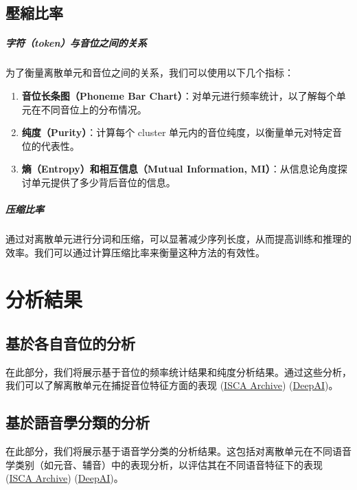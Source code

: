 \subsection{壓縮比率}



\subparagraph{字符（token）与音位之间的关系}

为了衡量离散单元和音位之间的关系，我们可以使用以下几个指标：

\begin{enumerate}
    \item \textbf{音位长条图（Phoneme Bar Chart）}：对单元进行频率统计，以了解每个单元在不同音位上的分布情况。
    \item \textbf{纯度（Purity）}：计算每个 cluster 单元内的音位纯度，以衡量单元对特定音位的代表性。
    \item \textbf{熵（Entropy）和相互信息（Mutual Information, MI）}：从信息论角度探讨单元提供了多少背后音位的信息。
\end{enumerate}

\subparagraph{压缩比率}

通过对离散单元进行分词和压缩，可以显著减少序列长度，从而提高训练和推理的效率。我们可以通过计算压缩比率来衡量这种方法的有效性。

 


\section{分析結果}


\subsection{基於各自音位的分析}

在此部分，我们将展示基于音位的频率统计结果和纯度分析结果。通过这些分析，我们可以了解离散单元在捕捉音位特征方面的表现 (\href{https://www.isca-archive.org/interspeech_2022/ren22_interspeech.html}{ISCA Archive}) (\href{https://deepai.org/publication/speech-pre-training-with-acoustic-piece}{DeepAI})。

\subsection{基於語音學分類的分析}


在此部分，我们将展示基于语音学分类的分析结果。这包括对离散单元在不同语音学类别（如元音、辅音）中的表现分析，以评估其在不同语音特征下的表现 (\href{https://www.isca-archive.org/interspeech_2022/ren22_interspeech.html}{ISCA Archive}) (\href{https://deepai.org/publication/speech-pre-training-with-acoustic-piece}{DeepAI})。



